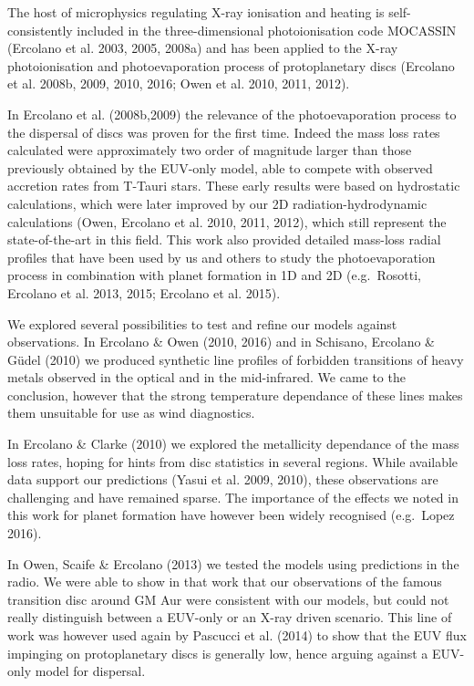 \documentclass[10pt,fleqn,twoside]{article}
\begin{document}
 The host of microphysics regulating
X-ray ionisation and heating is self-consistently included in the
three-dimensional photoionisation code MOCASSIN (Ercolano et al. 2003,
2005, 2008a) and has been applied to the X-ray photoionisation and
photoevaporation process of protoplanetary discs (Ercolano et
al. 2008b, 2009, 2010, 2016; Owen et al. 2010, 2011, 2012). 

In Ercolano et al. (2008b,2009) the relevance of the photoevaporation process
to the dispersal of discs was proven for the first time. Indeed the mass
loss rates calculated were approximately two order of magnitude larger
than those previously obtained by the EUV-only model, able to compete
with observed accretion rates from T-Tauri stars. These early results
were based on hydrostatic calculations, which were later improved by
our 2D radiation-hydrodynamic calculations (Owen, Ercolano et
al. 2010, 2011, 2012), which still represent the state-of-the-art in
this field. This work also provided detailed mass-loss radial profiles
that have been used by us and others to study the photoevaporation
process in combination with planet formation in 1D and 2D
(e.g.\ Rosotti, Ercolano et al. 2013, 2015; Ercolano et al. 2015). 

We explored several possibilities to test and refine our
models against observations. In Ercolano \& Owen (2010, 2016) and in
Schisano, Ercolano \& G\"udel (2010) we
produced synthetic line profiles of forbidden transitions of heavy
metals observed in the optical and in the mid-infrared. We came to the
conclusion, however that the strong temperature dependance of these
lines makes them unsuitable for use as wind diagnostics. 

In Ercolano
\& Clarke (2010) we explored the metallicity dependance of the mass
loss rates, hoping for hints from disc statistics in several
regions. While available data support our predictions (Yasui
et al. 2009, 2010), these observations are challenging and have
remained sparse. The importance of the effects we noted in this
work for planet formation have however been widely recognised
(e.g.\ Lopez 2016). 

In Owen, Scaife \& Ercolano (2013) we tested the models using
predictions in the radio. We were able to show in that work that our
observations of the famous transition disc around GM Aur were
consistent with our models, but could not really distinguish between
a EUV-only or an X-ray driven scenario. This line of work was however
used again by Pascucci et al. (2014) to show that the EUV flux
impinging on protoplanetary discs is generally low, hence arguing
against a EUV-only model for dispersal. 
\end{document}
